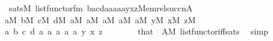 \begin{isabellebody}
\ \ \ \ \ \ \ {\isasymlongleftrightarrow}\ sats{\isacharparenleft}{\kern0pt}M{\isacharcomma}{\kern0pt}\ list{\isacharunderscore}{\kern0pt}functor{\isacharunderscore}{\kern0pt}fm{\isacharparenleft}{\kern0pt}{}{}{\isacharcomma}{\kern0pt}{}{\isacharcomma}{\kern0pt}{}{\isacharparenright}{\kern0pt}{\isacharcomma}{\kern0pt}\ {\isacharbrackleft}{\kern0pt}b{\isacharcomma}{\kern0pt}a{\isacharcomma}{\kern0pt}c{\isacharcomma}{\kern0pt}d{\isacharcomma}{\kern0pt}a{}{\isacharcomma}{\kern0pt}a{}{\isacharcomma}{\kern0pt}a{}{\isacharcomma}{\kern0pt}a{}{\isacharcomma}{\kern0pt}a{}{\isacharcomma}{\kern0pt}y{\isacharcomma}{\kern0pt}x{\isacharcomma}{\kern0pt}z{\isacharcomma}{\kern0pt}Memrel{\isacharparenleft}{\kern0pt}succ{\isacharparenleft}{\kern0pt}n{\isacharparenright}{\kern0pt}{\isacharparenright}{\kern0pt}{\isacharcomma}{\kern0pt}A{\isacharcomma}{\kern0pt}{}{\isacharbrackright}{\kern0pt}{\isacharparenright}{\kern0pt}{\isachardoublequoteclose}\isanewline
\ \ \ \ \ \ \ {\isachardoublequoteopen}a{\isasymin}M{\isachardoublequoteclose}\ {\isachardoublequoteopen}b{\isasymin}M{\isachardoublequoteclose}\ {\isachardoublequoteopen}c{\isasymin}M{\isachardoublequoteclose}\ {\isachardoublequoteopen}d{\isasymin}M{\isachardoublequoteclose}\ {\isachardoublequoteopen}a{}{\isasymin}M{\isachardoublequoteclose}\ {\isachardoublequoteopen}a{}{\isasymin}M{\isachardoublequoteclose}\ {\isachardoublequoteopen}a{}{\isasymin}M{\isachardoublequoteclose}\ {\isachardoublequoteopen}a{}{\isasymin}M{\isachardoublequoteclose}\ {\isachardoublequoteopen}a{}{\isasymin}M{\isachardoublequoteclose}\ {\isachardoublequoteopen}y{\isasymin}M{\isachardoublequoteclose}\ {\isachardoublequoteopen}x{\isasymin}M{\isachardoublequoteclose}\ {\isachardoublequoteopen}z{\isasymin}M{\isachardoublequoteclose}\isanewline
\ \ \ \ \ \ \ a\ b\ c\ d\ a{}\ a{}\ a{}\ a{}\ a{}\ y\ x\ z\isanewline
\ \ \ \ \ \ \isamarkupfalse%
\ that\ {}\ {\isacartoucheopen}A{\isasymin}M{\isacartoucheclose}\ list{\isacharunderscore}{\kern0pt}functor{\isacharunderscore}{\kern0pt}iff{\isacharunderscore}{\kern0pt}sats\ \isamarkupfalse%
\ simp\isanewline
\ \ \ \ \isamarkupfalse%
\ \isamarkupfalse%

\end{isabellebody}
